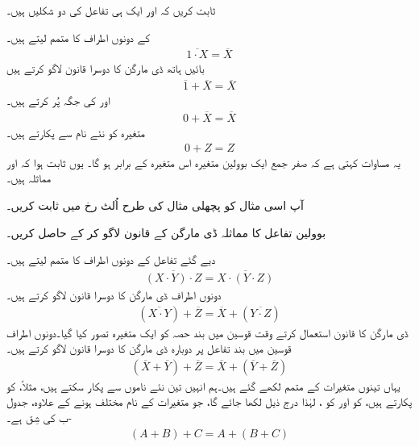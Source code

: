 ثابت کریں کہ  اور  ایک ہی تفاعل کی دو شکلیں ہیں۔

\quad
{}	کے دونوں اطراف کا متمم لیتے ہیں۔
\begin{align*}
\overline{1\cdot X}=\overline{X}
\end{align*}
بائیں ہاتھ ڈی مارگن کا دوسرا قانون لاگو کرتے ہیں
\begin{align*}
\overline{1}+\overline{X}=\overline{X}
\end{align*}
اور  کی جگہ  پُر کرتے ہیں۔
\begin{align*}
0+\overline{X}=\overline{X}
\end{align*}
متغیرہ  کو نئے نام  سے پکارتے ہیں۔
\begin{align*}
0+Z=Z
\end{align*}
یہ مساوات کہتی ہے کہ صفر جمع ایک بوولین متغیرہ اس متغیرہ کے برابر ہو گا۔ یوں ثابت ہوا کہ  اور  مماثلہ ہیں۔

آپ اسی مثال کو پچھلی مثال کی طرح اُلٹ رخ میں ثابت کریں۔

 بوولین تفاعل  کا مماثلہ ڈی مارگن کے قانون لاگو کر کے حاصل کریں۔

\quad
دیے گئے تفاعل کے دونوں اطراف کا متمم لیتے ہیں۔
\begin{align*}
\overline{(X\cdot Y)\cdot Z}=\overline{X\cdot(Y\cdot Z)}
\end{align*}
دونوں اطراف ڈی مارگن کا دوسرا قانون لاگو کرتے ہیں۔
\begin{align*}
(\overline{X\cdot Y})+\overline{Z}=\overline{X}+(\overline{Y\cdot Z})
\end{align*}
ڈی مارگن کا قانون استعمال کرتے وقت قوسین میں بند حصہ کو ایک متغیرہ تصور کیا گیا۔دونوں اطراف قوسین میں بند تفاعل پر دوبارہ ڈی مارگن کا دوسرا قانون لاگو کرتے ہیں۔
\begin{align*}
(\overline{X}+\overline{ Y})+\overline{Z}=\overline{X}+(\overline{Y}+\overline{Z})
\end{align*}
یہاں تینوں متغیرات کے متمم لکھے گئے ہیں۔ہم انہیں تین نئے ناموں سے پکار سکتے ہیں، مثلاً، کو  پکارتے ہیں،  کو  اور  کو ، لہٰذا درج ذیل لکھا جائے گا، جو متغیرات کے نام مختلف ہونے کے علاوہ، جدول -ب کی شِق  ہے۔
\begin{align*}
(A+B)+C=A+(B+C)
\end{align*}


